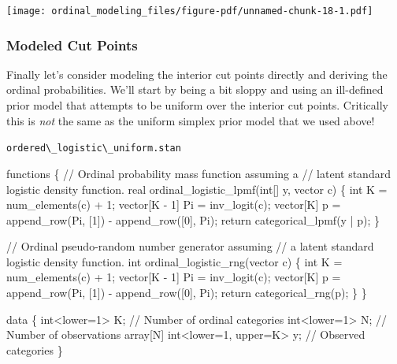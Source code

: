 \documentclass[
  letterpaper,
  DIV=11,
  numbers=noendperiod]{scrartcl}
\newenvironment{Shaded}{\begin{snugshade}}{\end{snugshade}}
\newcommand{\CommentTok}[1]{\textcolor[rgb]{0.37,0.37,0.37}{#1}}
\newcommand{\ControlFlowTok}[1]{\textcolor[rgb]{0.00,0.23,0.31}{#1}}
\newcommand{\DataTypeTok}[1]{\textcolor[rgb]{0.68,0.00,0.00}{#1}}
\newcommand{\DecValTok}[1]{\textcolor[rgb]{0.68,0.00,0.00}{#1}}
\newcommand{\KeywordTok}[1]{\textcolor[rgb]{0.00,0.23,0.31}{#1}}
\newcommand{\NormalTok}[1]{\textcolor[rgb]{0.00,0.23,0.31}{#1}}
\begin{document}
\texttt{[image: ordinal\_modeling\_files/figure-pdf/unnamed-chunk-18-1.pdf]}

\subsubsection{Modeled Cut Points}\label{modeled-cut-points}

Finally let's consider modeling the interior cut points directly and
deriving the ordinal probabilities. We'll start by being a bit sloppy
and using an ill-defined prior model that attempts to be uniform over
the interior cut points. Critically this is \emph{not} the same as the
uniform simplex prior model that we used above!

\begin{codelisting}

\caption{\texttt{ordered\textbackslash\_logistic\textbackslash\_uniform.stan}}

\begin{Shaded}
\begin{Highlighting}[]
\KeywordTok{functions}\NormalTok{ \{}
  \CommentTok{// Ordinal probability mass function assuming a}
  \CommentTok{// latent standard logistic density function.}
  \DataTypeTok{real}\NormalTok{ ordinal\_logistic\_lpmf(}\DataTypeTok{int}\NormalTok{[] y, }\DataTypeTok{vector}\NormalTok{ c) \{}
    \DataTypeTok{int}\NormalTok{ K = num\_elements(c) + }\DecValTok{1}\NormalTok{;}
    \DataTypeTok{vector}\NormalTok{[K {-} }\DecValTok{1}\NormalTok{] Pi = inv\_logit(c);}
    \DataTypeTok{vector}\NormalTok{[K] p = append\_row(Pi, [}\DecValTok{1}\NormalTok{]\textquotesingle{}) {-} append\_row([}\DecValTok{0}\NormalTok{]\textquotesingle{}, Pi);}
    \ControlFlowTok{return}\NormalTok{ categorical\_lpmf(y | p);}
\NormalTok{  \}}

  \CommentTok{// Ordinal pseudo{-}random number generator assuming}
  \CommentTok{// a latent standard logistic density function.}
  \DataTypeTok{int}\NormalTok{ ordinal\_logistic\_rng(}\DataTypeTok{vector}\NormalTok{ c) \{}
    \DataTypeTok{int}\NormalTok{ K = num\_elements(c) + }\DecValTok{1}\NormalTok{;}
    \DataTypeTok{vector}\NormalTok{[K {-} }\DecValTok{1}\NormalTok{] Pi = inv\_logit(c);}
    \DataTypeTok{vector}\NormalTok{[K] p = append\_row(Pi, [}\DecValTok{1}\NormalTok{]\textquotesingle{}) {-} append\_row([}\DecValTok{0}\NormalTok{]\textquotesingle{}, Pi);}
    \ControlFlowTok{return}\NormalTok{ categorical\_rng(p);}
\NormalTok{  \}}
\NormalTok{\}}

\KeywordTok{data}\NormalTok{ \{}
  \DataTypeTok{int}\NormalTok{\textless{}}\KeywordTok{lower}\NormalTok{=}\DecValTok{1}\NormalTok{\textgreater{} K;                   }\CommentTok{// Number of ordinal categories}
  \DataTypeTok{int}\NormalTok{\textless{}}\KeywordTok{lower}\NormalTok{=}\DecValTok{1}\NormalTok{\textgreater{} N;                   }\CommentTok{// Number of observations}
  \DataTypeTok{array}\NormalTok{[N] }\DataTypeTok{int}\NormalTok{\textless{}}\KeywordTok{lower}\NormalTok{=}\DecValTok{1}\NormalTok{, }\KeywordTok{upper}\NormalTok{=K\textgreater{} y; }\CommentTok{// Observed categories}
\NormalTok{\}}


\end{Highlighting}
\end{Shaded}
\end{codelisting}
\end{document}
